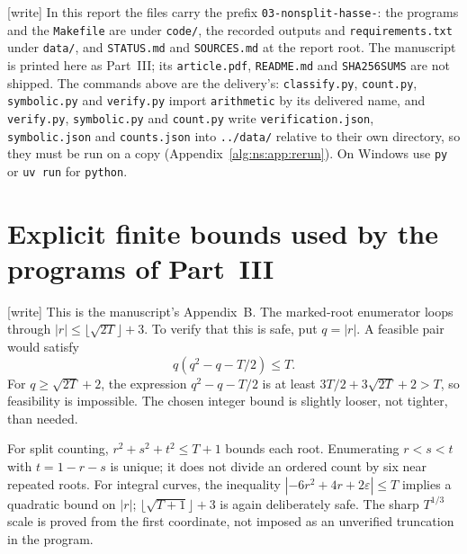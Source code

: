 \documentclass[11pt]{article}
\numberwithin{equation}{section}
\theoremstyle{plain}
\theoremstyle{plain}
\theoremstyle{plain}
\theoremstyle{definition}
\theoremstyle{definition}
\theoremstyle{definition}
\theoremstyle{remark}
\newcommand{\wtag}{\textup{[write]}}%
\newcommand{\rpath}[1]{\nolinkurl{#1}}
\begin{document}
\wtag{} In this report the files carry the prefix
\texttt{03-nonsplit-hasse-}: the programs and the \texttt{Makefile} are
under \rpath{code/}, the recorded outputs and \texttt{requirements.txt}
under \rpath{data/}, and \texttt{STATUS.md} and \texttt{SOURCES.md} at
the report root. The manuscript is printed here as Part~III; its
\texttt{article.pdf}, \texttt{README.md} and \texttt{SHA256SUMS} are not
shipped. The commands above are the delivery's: \texttt{classify.py},
\texttt{count.py}, \texttt{symbolic.py} and \texttt{verify.py} import
\texttt{arithmetic} by its delivered name, and \texttt{verify.py},
\texttt{symbolic.py} and \texttt{count.py} write \texttt{verification.json},
\texttt{symbolic.json} and \texttt{counts.json} into \rpath{../data/}
relative to their own directory, so they must be run on a copy
(Appendix~\ref{alg:ns:app:rerun}). On Windows use \texttt{py} or
\texttt{uv run} for \texttt{python}.

\section{Explicit finite bounds used by the programs of Part~III}\label{alg:ns:app:bounds}
\wtag{} This is the manuscript's Appendix~B.
The marked-root enumerator loops through
$|r|\le\lfloor\sqrt{2T}\rfloor+3$. To verify that this is safe, put
$q=|r|$. A feasible pair would satisfy
\[
q(q^2-q-T/2)\le T.
\]
For $q\ge\sqrt{2T}+2$, the expression $q^2-q-T/2$ is at least
$3T/2+3\sqrt{2T}+2>T$, so feasibility is impossible. The chosen integer
bound is slightly looser, not tighter, than needed.

For split counting, $r^2+s^2+t^2\le T+1$ bounds each root. Enumerating
$r<s<t$ with $t=1-r-s$ is unique; it does not divide an ordered count by
six near repeated roots. For integral curves, the inequality
$|-6r^2+4r+2\varepsilon|\le T$ implies a quadratic bound on $|r|$;
$\lfloor\sqrt{T+1}\rfloor+3$ is again deliberately safe. The sharp
$T^{1/3}$ scale is proved from the first coordinate, not imposed as an
unverified truncation in the program.
\end{document}
